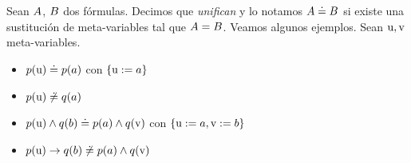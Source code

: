 \begin{definition}[Unificación]
    Sean $A$, $B$ dos fórmulas. Decimos que \textit{unifican} y lo
    notamos $A \doteq B$ si existe una sustitución de
    meta-variables tal que $A = B$. Veamos algunos ejemplos. Sean $\textrm{u}, \textrm{v}$ meta-variables.

    \begin{itemize}
    \item $p(\textrm{u}) \doteq p(a)$ con $\{\textrm{u} := a\}$
        \item $p(\textrm{u}) \not\doteq q(a)$
        \item $p(\textrm{u}) \wedge q(b) \doteq p(a) \wedge q(\textrm{v})$
        con $\{\textrm{u} := a, \textrm{v} := b\}$
        \item $p(\textrm{u}) \to q(b) \not\doteq p(a) \wedge q(\textrm{v})$
    \end{itemize}
    
\end{definition}

